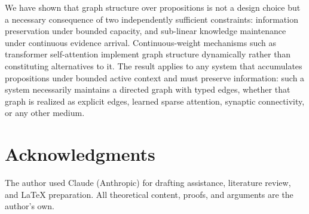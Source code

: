 \documentclass[11pt]{article}
\theoremstyle{definition}
\begin{document}
We have shown that graph structure over propositions is not a design
choice but a necessary consequence of two independently sufficient
constraints: information preservation under bounded capacity, and
sub-linear knowledge maintenance under continuous evidence arrival.
Continuous-weight mechanisms such as transformer self-attention implement
graph structure dynamically rather than constituting alternatives to it.
The result applies to any system that accumulates
propositions under bounded active context and must preserve information:
such a system necessarily maintains a directed graph with typed edges, whether that
graph is realized as explicit edges, learned sparse attention, synaptic
connectivity, or any other medium.

\section*{Acknowledgments}

The author used Claude (Anthropic) for drafting assistance, literature review, and \LaTeX{} preparation. All theoretical content, proofs, and arguments are the author's own.
\end{document}

